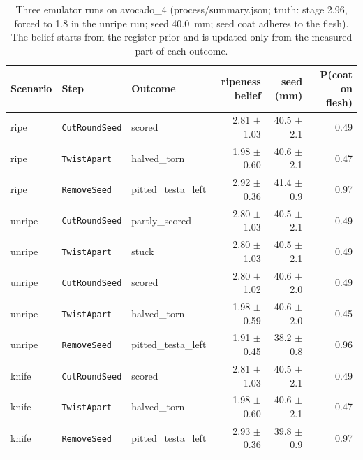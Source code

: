\documentclass[10.5pt,a4paper]{article}
\begin{document}
\begin{table}[htbp]\centering\scriptsize\caption{Three emulator runs on avocado\_4 (process/summary.json; truth: stage 2.96, forced to 1.8 in the unripe run; seed 40.0~mm; seed coat adheres to the flesh). The belief starts from the register prior and is updated only from the measured part of each outcome.}
\begin{tabularx}{\linewidth}{@{}lllrrr@{}}\toprule Scenario & Step & Outcome & ripeness belief & seed (mm) & P(coat on flesh) \\\midrule
ripe & \texttt{CutRoundSeed} & scored & 2.81 $\pm$ 1.03 & 40.5 $\pm$ 2.1 & 0.49 \\
ripe & \texttt{TwistApart} & halved\_torn & 1.98 $\pm$ 0.60 & 40.6 $\pm$ 2.1 & 0.47 \\
ripe & \texttt{RemoveSeed} & pitted\_testa\_left & 2.92 $\pm$ 0.36 & 41.4 $\pm$ 0.9 & 0.97 \\
unripe & \texttt{CutRoundSeed} & partly\_scored & 2.80 $\pm$ 1.03 & 40.5 $\pm$ 2.1 & 0.49 \\
unripe & \texttt{TwistApart} & stuck & 2.80 $\pm$ 1.03 & 40.5 $\pm$ 2.1 & 0.49 \\
unripe & \texttt{CutRoundSeed} & scored & 2.80 $\pm$ 1.02 & 40.6 $\pm$ 2.0 & 0.49 \\
unripe & \texttt{TwistApart} & halved\_torn & 1.98 $\pm$ 0.59 & 40.6 $\pm$ 2.0 & 0.45 \\
unripe & \texttt{RemoveSeed} & pitted\_testa\_left & 1.91 $\pm$ 0.45 & 38.2 $\pm$ 0.8 & 0.96 \\
knife & \texttt{CutRoundSeed} & scored & 2.81 $\pm$ 1.03 & 40.5 $\pm$ 2.1 & 0.49 \\
knife & \texttt{TwistApart} & halved\_torn & 1.98 $\pm$ 0.60 & 40.6 $\pm$ 2.1 & 0.47 \\
knife & \texttt{RemoveSeed} & pitted\_testa\_left & 2.93 $\pm$ 0.36 & 39.8 $\pm$ 0.9 & 0.97 \\\bottomrule\end{tabularx}\end{table}
\end{document}
